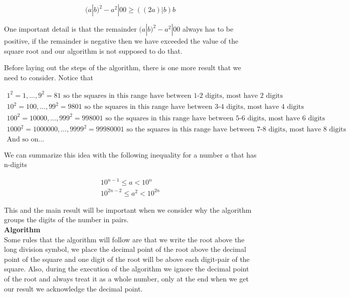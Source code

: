 \documentclass{uofa_template}
\begin{document}
\begin{enumerate}
\begin{equation}
(a|b)^2 - a^2|00 \geq ((2a)|b)b
\end{equation}

One important detail is that the remainder $(a|b)^2 - a^2|00$ always has to be positive, if
the remainder is negative then we have exceeded the value of the square root and our algorithm is not supposed to do that.

Before laying out the steps of the algorithm, there is one more result that we need to consider. Notice that

\begin{equation}
\begin{gathered}
1^2 = 1, ..., 9^2 = 81 \text{   so the squares in this range have between 1-2 digits, most have 2 digits} \\
10^2 = 100, ..., 99^2 = 9801 \text{   so the squares in this range have between 3-4 digits, most have 4 digits} \\
100^2 = 10000, ..., 999^2 = 998001 \text{   so the squares in this range have between 5-6 digits, most have 6 digits} \\
1000^2 = 1000000, ..., 9999^2 = 99980001 \text{  so the squares in this range have between 7-8 digits, most have 8 digits } \\
\text{And so on...}
\end{gathered}
\end{equation}

We can summarize this idea with the following inequality for a number $a$ that has n-digits

\begin{equation}
\begin{gathered}
10^{n-1} \leq a < 10^n \\
10^{2n-2} \leq a^2 < 10^{2n}
\end{gathered}
\end{equation}

This and the main result will be important when we consider why the algorithm groups the digits of the number in pairs. \\

\textbf{Algorithm} \\

Some rules that the algorithm will follow are that we write the root above the long
division symbol, we place the decimal point of the root above the decimal point of the square and one digit of the root will be above each digit-pair of the square. Also, during the execution of the algorithm we ignore the decimal point of the root and always treat it as a whole number, only at the end when we get our result we acknowledge the decimal point.


\end{enumerate}
\end{document}
